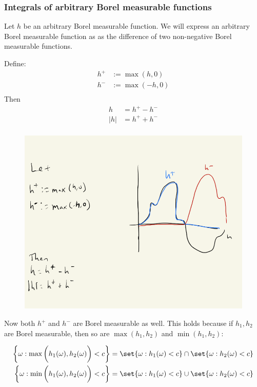 \documentclass{article} %
\begin{document}

\subsubsection{Integrals of arbitrary Borel measurable functions}

Let $h$ be an arbitrary Borel measurable function.   We will express an arbitrary Borel measurable function as as the difference of two non-negative Borel measurable functions.

Define:
\begin{align*}
h^+ &:= \max (h,0) \\
h^- &:= \max (-h,0) \\	
\end{align*}
Then 
\begin{align*}
h &= h^+ - h^- \\
|h| &= h^+ + h^- \\	
\end{align*}

\begin{figure}[H]
\centering
\includegraphics[width=.7\textwidth]{images/arbitrary_borel_measurable_functions_in_terms_of_nonnegative_borel_measurable_functions}
\end{figure}

Now both $h^+$ and $h^-$ are Borel measurable as well.  This holds because if $h_1, h_2$ are Borel measurable, then so are $\max(h_1,h_2)$ and $\min(h_1,h_2)$:

\begin{align*}
\bigg\{ \omega : \max \bigg( h_1(\omega), h_2(\omega) \bigg) < c  \bigg\} &=	\set{\omega :  h_1(\omega) < c } \cap \set{\omega : h_2(\omega) < c } \\
\bigg\{ \omega : \min \bigg( h_1(\omega), h_2(\omega) \bigg)  < c \bigg\} &=	\set{\omega :  h_1(\omega) < c } \cup \set{\omega : h_2(\omega) < c }
\end{align*}
\end{document}
